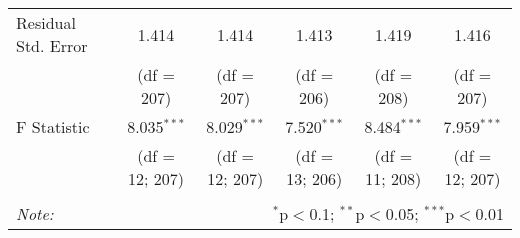 \begin{table}[H]
\begin{adjustbox}{width=\textwidth, totalheight=\baselineskip}
\begin{tabular}{@{\extracolsep{5pt}}lccccc}
Residual Std. Error & 1.414 & 1.414  & 1.413  & 1.419 & 1.416  \\ 
& (df = 207) & (df = 207) & (df = 206) & (df = 208) & (df = 207) \\
F Statistic & 8.035$^{***}$  & 8.029$^{***}$  & 7.520$^{***}$  & 8.484$^{***}$  & 7.959$^{***}$ \\ 
& (df = 12; 207) & (df = 12; 207) & (df = 13; 206) & (df = 11; 208) & (df = 12; 207) \\
\hline 
\hline \\[-1.8ex] 
\textit{Note:}  & \multicolumn{5}{r}{$^{*}$p$<$0.1; $^{**}$p$<$0.05; $^{***}$p$<$0.01} \\ 
\end{tabular} 
\end{adjustbox}
\end{table} 
  
  
  
  
  
  
  
